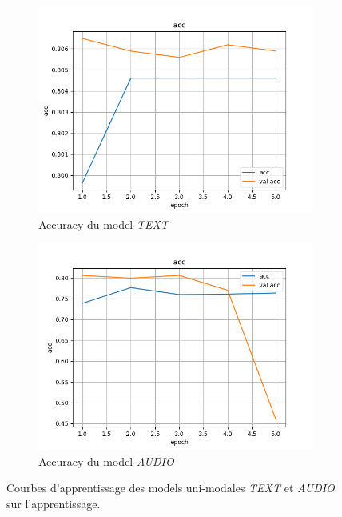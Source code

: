 \documentclass[a4paper]{article}
\begin{document}
\begin{figure}[H]
    \centering
    \begin{subfigure}{0.45\textwidth}
        \includegraphics[width=\textwidth]{../logs/text_1/acc.png}
        \caption{Accuracy du model \textit{TEXT}}
    \end{subfigure}
    \hfill
    \begin{subfigure}{0.45\textwidth}
        \includegraphics[width=\textwidth]{../logs/audio_0/acc.png}
        \caption{Accuracy du model \textit{AUDIO}}
    \end{subfigure}
    \caption{Courbes d'apprentissage des models uni-modales \textit{TEXT} et \textit{AUDIO} sur l'apprentissage.}
    \label{fig: train unimodale}
\end{figure}
\end{document}
